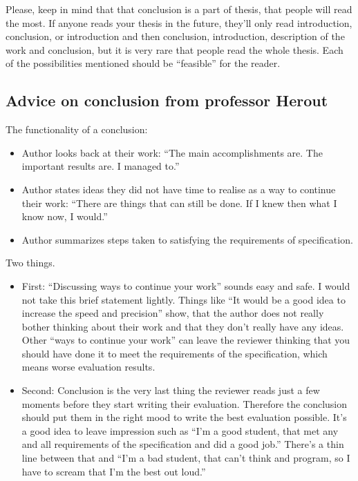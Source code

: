 Please, keep in mind that that conclusion is a part of thesis, that people will read the most. If anyone reads your thesis in the future, they'll only read introduction, conclusion, or introduction and then conclusion, introduction, description of the work and conclusion, but it is very rare that people read the whole thesis. Each of the possibilities mentioned should be ``feasible'' for the reader.


\subsection{Advice on conclusion from professor Herout}
The functionality of a conclusion:

\begin{itemize}
  \item{Author looks back at their work: ``The main accomplishments are. The important results are. I managed to.''}
  \item{Author states ideas they did not have time to realise as a way to continue their work: ``There are things that can still be done. If I knew then what I know now, I would.''}
  \item{Author summarizes steps taken to satisfying the requirements of specification.}
\end{itemize}

\begin{samepage}
\noindent Two things.
\begin{itemize}
  \item{First: ``Discussing ways to continue your work'' sounds easy and safe. I would not take this brief statement lightly. Things like ``It would be a good idea to increase the speed and precision'' show, that the author does not really bother thinking about their work and that they don't really have any ideas. Other ``ways to continue your work'' can leave the reviewer thinking that you should have done it to meet the requirements of the specification, which means worse evaluation results.}
  \item{Second: Conclusion is the very last thing the reviewer reads just a few moments before they start writing their evaluation. Therefore the conclusion should put them in the right mood to write the best evaluation possible. It's a good idea to leave impression such as ``I'm a good student, that met any and all requirements of the specification and did a good job.'' There's a thin line between that and ``I'm a bad student, that can't think and program, so I have to scream that I'm the best out loud.''}
\end{itemize}
\end{samepage}

